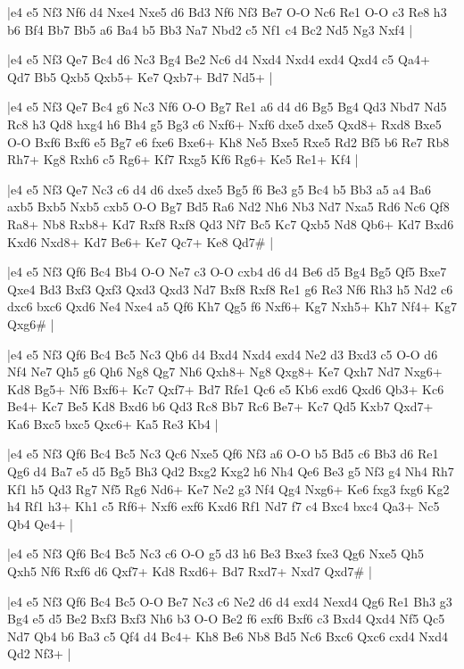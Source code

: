 \whitename{}
\blackname{}
\makegametitle
|e4 e5 Nf3 Nf6 d4 Nxe4 Nxe5 d6 Bd3 Nf6 Nf3 Be7 O-O Nc6 Re1 O-O c3 Re8 h3 b6 Bf4 Bb7 Bb5 a6 Ba4 b5 Bb3 Na7 Nbd2 c5 Nf1 c4 Bc2 Nd5 Ng3 Nxf4  |

\whitename{}
\blackname{}
\makegametitle
|e4 e5 Nf3 Qe7 Bc4 d6 Nc3 Bg4 Be2 Nc6 d4 Nxd4 Nxd4 exd4 Qxd4 c5 Qa4+ Qd7 Bb5 Qxb5 Qxb5+ Ke7 Qxb7+ Bd7 Nd5+  |

\whitename{}
\blackname{}
\makegametitle
|e4 e5 Nf3 Qe7 Bc4 g6 Nc3 Nf6 O-O Bg7 Re1 a6 d4 d6 Bg5 Bg4 Qd3 Nbd7 Nd5 Rc8 h3 Qd8 hxg4 h6 Bh4 g5 Bg3 c6 Nxf6+ Nxf6 dxe5 dxe5 Qxd8+ Rxd8 Bxe5 O-O Bxf6 Bxf6 e5 Bg7 e6 fxe6 Bxe6+ Kh8 Ne5 Bxe5 Rxe5 Rd2 Bf5 b6 Re7 Rb8 Rh7+ Kg8 Rxh6 c5 Rg6+ Kf7 Rxg5 Kf6 Rg6+ Ke5 Re1+ Kf4  |

\whitename{}
\blackname{}
\makegametitle
|e4 e5 Nf3 Qe7 Nc3 c6 d4 d6 dxe5 dxe5 Bg5 f6 Be3 g5 Bc4 b5 Bb3 a5 a4 Ba6 axb5 Bxb5 Nxb5 cxb5 O-O Bg7 Bd5 Ra6 Nd2 Nh6 Nb3 Nd7 Nxa5 Rd6 Nc6 Qf8 Ra8+ Nb8 Rxb8+ Kd7 Rxf8 Rxf8 Qd3 Nf7 Bc5 Kc7 Qxb5 Nd8 Qb6+ Kd7 Bxd6 Kxd6 Nxd8+ Kd7 Be6+ Ke7 Qc7+ Ke8 Qd7\#  |

\whitename{}
\blackname{}
\makegametitle
|e4 e5 Nf3 Qf6 Bc4 Bb4 O-O Ne7 c3 O-O cxb4 d6 d4 Be6 d5 Bg4 Bg5 Qf5 Bxe7 Qxe4 Bd3 Bxf3 Qxf3 Qxd3 Qxd3 Nd7 Bxf8 Rxf8 Re1 g6 Re3 Nf6 Rh3 h5 Nd2 c6 dxc6 bxc6 Qxd6 Ne4 Nxe4 a5 Qf6 Kh7 Qg5 f6 Nxf6+ Kg7 Nxh5+ Kh7 Nf4+ Kg7 Qxg6\#  |

\whitename{}
\blackname{}
\makegametitle
|e4 e5 Nf3 Qf6 Bc4 Bc5 Nc3 Qb6 d4 Bxd4 Nxd4 exd4 Ne2 d3 Bxd3 c5 O-O d6 Nf4 Ne7 Qh5 g6 Qh6 Ng8 Qg7 Nh6 Qxh8+ Ng8 Qxg8+ Ke7 Qxh7 Nd7 Nxg6+ Kd8 Bg5+ Nf6 Bxf6+ Kc7 Qxf7+ Bd7 Rfe1 Qc6 e5 Kb6 exd6 Qxd6 Qb3+ Kc6 Be4+ Kc7 Be5 Kd8 Bxd6 b6 Qd3 Rc8 Bb7 Rc6 Be7+ Kc7 Qd5 Kxb7 Qxd7+ Ka6 Bxc5 bxc5 Qxc6+ Ka5 Re3 Kb4  |

\whitename{}
\blackname{}
\makegametitle
|e4 e5 Nf3 Qf6 Bc4 Bc5 Nc3 Qc6 Nxe5 Qf6 Nf3 a6 O-O b5 Bd5 c6 Bb3 d6 Re1 Qg6 d4 Ba7 e5 d5 Bg5 Bh3 Qd2 Bxg2 Kxg2 h6 Nh4 Qe6 Be3 g5 Nf3 g4 Nh4 Rh7 Kf1 h5 Qd3 Rg7 Nf5 Rg6 Nd6+ Ke7 Ne2 g3 Nf4 Qg4 Nxg6+ Ke6 fxg3 fxg6 Kg2 h4 Rf1 h3+ Kh1 c5 Rf6+ Nxf6 exf6 Kxd6 Rf1 Nd7 f7 c4 Bxc4 bxc4 Qa3+ Nc5 Qb4 Qe4+  |

\whitename{}
\blackname{}
\makegametitle
|e4 e5 Nf3 Qf6 Bc4 Bc5 Nc3 c6 O-O g5 d3 h6 Be3 Bxe3 fxe3 Qg6 Nxe5 Qh5 Qxh5 Nf6 Rxf6 d6 Qxf7+ Kd8 Rxd6+ Bd7 Rxd7+ Nxd7 Qxd7\#  |

\whitename{}
\blackname{}
\makegametitle
|e4 e5 Nf3 Qf6 Bc4 Bc5 O-O Be7 Nc3 c6 Ne2 d6 d4 exd4 Nexd4 Qg6 Re1 Bh3 g3 Bg4 e5 d5 Be2 Bxf3 Bxf3 Nh6 b3 O-O Be2 f6 exf6 Bxf6 c3 Bxd4 Qxd4 Nf5 Qc5 Nd7 Qb4 b6 Ba3 c5 Qf4 d4 Bc4+ Kh8 Be6 Nb8 Bd5 Nc6 Bxc6 Qxc6 cxd4 Nxd4 Qd2 Nf3+  |

